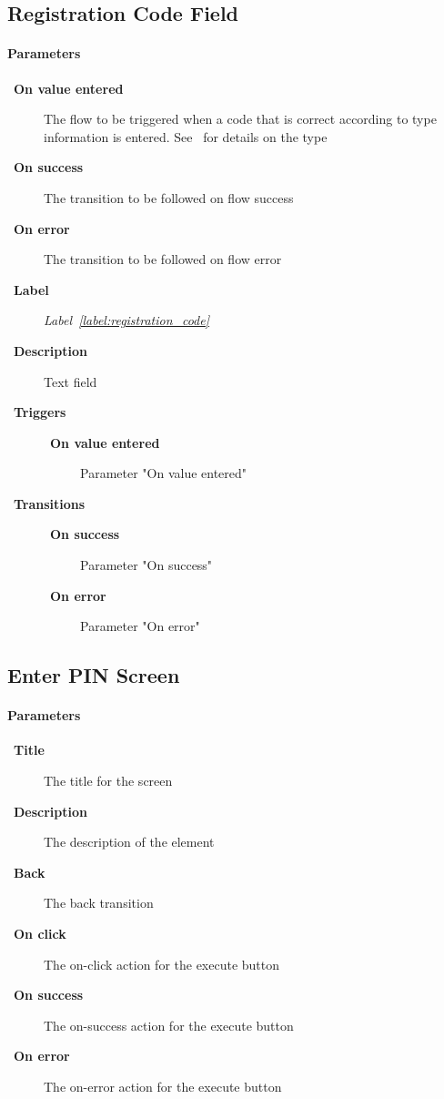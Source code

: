 \documentclass[a4paper,10pt]{article}
\newcommand{\labelLabelText}{Label}
\newcommand{\labelLabel}{label:}
\DeclareRobustCommand{\labelRef}[1]{%
   \emph{\labelLabelText~\ref{\labelLabel#1}}}
\newcommand{\elementLabel}{element:}
\DeclareRobustCommand{\element}[2]{\subsection{#1}\label{\elementLabel#2}}
\let\Item\item
\newcommand\SpecialItem{\renewcommand\item[1][]{\Item[\textbullet~\bfseries##1]}
}
\begin{document}
\element{Registration Code Field}{registration_code_field}

\paragraph{Parameters}
\SpecialItem
\begin{description}
 \item[On value entered] The flow to be triggered when a code that is correct 
according to type information is entered. See~\cite{crypto_spec} for details on 
the type
 \item[On success] The transition to be followed on flow success
 \item[On error] The transition to be followed on flow error
\end{description}

\begin{description}
 \item[Label] \labelRef{registration_code}
 \item[Description] Text field
 \item[Triggers]\mbox{}
 \begin{description}
  \item[On value entered] Parameter "On value entered"
 \end{description}
 \item[Transitions]\mbox{}
  \begin{description}
   \item[On success] Parameter "On success"
   \item[On error] Parameter "On error"
  \end{description}
\end{description}

\element{Enter PIN Screen}{enter_pin_screen}

\paragraph{Parameters}
\SpecialItem
\begin{description}
 \item[Title] The title for the screen
 \item[Description] The description of the element
 \item[Back] The back transition
 \item[On click] The on-click action for the execute button
 \item[On success] The on-success action for the execute button
 \item[On error] The on-error action for the execute button
\end{description}
\end{document}

